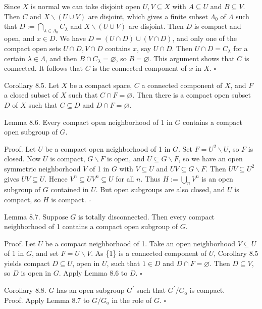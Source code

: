 \documentclass[10pt]{article}
\begin{document}
Since $X$ is normal we can take disjoint open $U, V \subseteq X$ with $A \subseteq U$ and $B \subseteq V$. Then $C$ and $X \backslash(U \cup V)$ are disjoint, which gives a finite subset $\Lambda_{0}$ of $\Lambda$ such that $D:=\bigcap_{\lambda \in \Lambda_{0}} C_{\lambda}$ and $X \backslash(U \cup V)$ are disjoint. Then $D$ is compact and open, and $x \in D$. We have $D=(U \cap D) \cup(V \cap D)$, and only one of the compact open sets $U \cap D, V \cap D$ contains $x$, say $U \cap D$. Then $U \cap D=C_{\lambda}$ for a certain $\lambda \in \Lambda$, and then $B \cap C_{\lambda}=\varnothing$, so $B=\varnothing$. This argument shows that $C$ is connected. It follows that $C$ is the connected component of $x$ in $X$. \(\square\)

Corollary 8.5. Let $X$ be a compact space, $C$ a connected component of $X$, and $F$ a closed subset of $X$ such that $C \cap F=\varnothing$. Then there is a compact open subset $D$ of $X$ such that $C \subseteq D$ and $D \cap F=\varnothing$.

Lemma 8.6. Every compact open neighborhood of 1 in $G$ contains a compact open subgroup of $G$.

Proof. Let $U$ be a compact open neighborhood of 1 in $G$. Set $F=U^{2} \backslash U$, so $F$ is closed. Now $U$ is compact, $G \backslash F$ is open, and $U \subseteq G \backslash F$, so we have an open symmetric neighborhood $V$ of 1 in $G$ with $V \subseteq U$ and $U V \subseteq G \backslash F$. Then $U V \subseteq U^{2}$ gives $U V \subseteq U$. Hence $V^{n} \subseteq U V^{n} \subseteq U$ for all $n$. Thus $H:=\bigcup_{n} V^{n}$ is an open subgroup of $G$ contained in $U$. But open subgroups are also closed, and $U$ is compact, so $H$ is compact. \(\square\)

Lemma 8.7. Suppose $G$ is totally disconnected. Then every compact neighborhood of 1 contains a compact open subgroup of $G$.

Proof. Let $U$ be a compact neighborhood of 1. Take an open neighborhood $V \subseteq U$ of 1 in $G$, and set $F=U \backslash V$. As \{1\} is a connected component of $U$, Corollary 8.5 yields compact $D \subseteq U$, open in $U$, such that $1 \in D$ and $D \cap F=\varnothing$. Then $D \subseteq V$, so $D$ is open in $G$. Apply Lemma 8.6 to $D$. \(\square\)

Corollary 8.8. $G$ has an open subgroup $G^{\prime}$ such that $G^{\prime} / G_{\mathrm{o}}$ is compact.\\
Proof. Apply Lemma 8.7 to $G / G_{\mathrm{o}}$ in the role of $G$. \(\square\)
\end{document}

